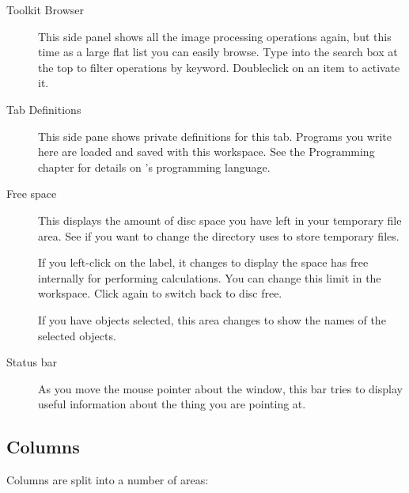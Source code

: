 \begin{description}
\item[Toolkit Browser]
This side panel shows all the image processing operations again, but this time
as a large flat list you can easily browse. Type into the search box at the
top to filter operations by keyword. Doubleclick on an item to activate it.

\item[Tab Definitions]
This side pane shows private definitions for this tab. Programs you
write here are loaded and saved with this workspace. See the Programming
chapter for details on \nip{}'s programming language.

\item[Free space]
This displays the amount of disc space you have left in your temporary
file area. See  if you want to change the directory \nip{}
uses to store temporary files.

If you left-click on the label, it changes to display the space \nip{} has
free internally for performing calculations. You can change this limit in the
 workspace. Click again to switch back to disc free.

If you have objects selected, this area changes to show the
names of the selected objects.

\item[Status bar]
As you move the mouse pointer about the window, this bar tries to display
useful information about the thing you are pointing at. 

\end{description}

\subsection{Columns}

Columns are split into a number of areas:

